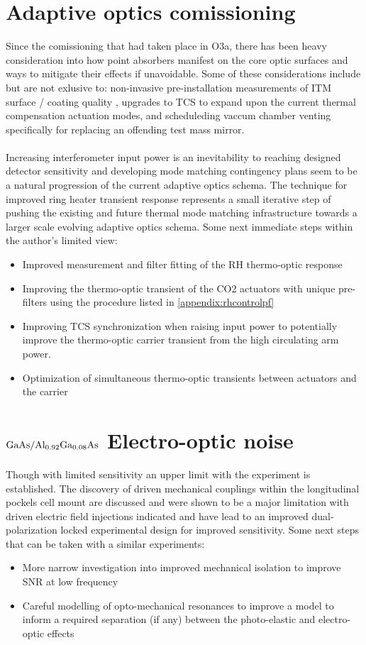 
\section{Adaptive optics comissioning}
Since the comissioning that had taken place in O3a, there has been heavy consideration into how point absorbers manifest on the core optic surfaces and ways to mitigate their effects if unavoidable. Some of these considerations include but are not exlusive to: non-invasive pre-installation measurements of ITM surface / coating quality \cite{dcc:paNSFupdate2022}, upgrades to TCS to expand upon the current thermal compensation actuation modes, and scheduleding vaccum chamber venting specifically for replacing an offending test mass mirror. 
\\
\\
Increasing interferometer input power is an inevitability to reaching designed detector sensitivity and developing mode matching contingency plans seem to be a natural progression of the current adaptive optics schema. The technique for improved ring heater transient response represents a small iterative step of pushing the existing and future thermal mode matching infrastructure towards a larger scale evolving adaptive optics schema. Some next immediate steps within the author's limited view:

\begin{itemize}
	\item Improved measurement and filter fitting of the RH thermo-optic response
	\item Improving the thermo-optic transient of the CO2 actuators with unique pre-filters using the procedure listed in \autoref{appendix:rhcontrolpf} 
	\item Improving TCS synchronization when raising input power to potentially improve the thermo-optic carrier transient from the high circulating arm power.
	\item Optimization of simultaneous thermo-optic transients between actuators and the carrier 
\end{itemize}

\section{\texorpdfstring{$\mathrm{GaAs} / \mathrm{Al_{0.92}Ga_{0.08}As}$}{gaas/algaas} Electro-optic noise}
Though with limited sensitivity an upper limit with the experiment is established. The discovery of driven mechanical couplings within the longitudinal pockels cell mount are discussed and were shown to be a major limitation with driven electric field injections indicated and have lead to an improved dual-polarization locked experimental design for improved sensitivity. Some next steps that can be taken with a similar experiments:

\begin{itemize}
	\item More narrow investigation into improved mechanical isolation to improve SNR at low frequency
	\item Careful modelling of opto-mechanical resonances to improve a model to inform a required separation (if any) between the photo-elastic and electro-optic effects 
\end{itemize}
